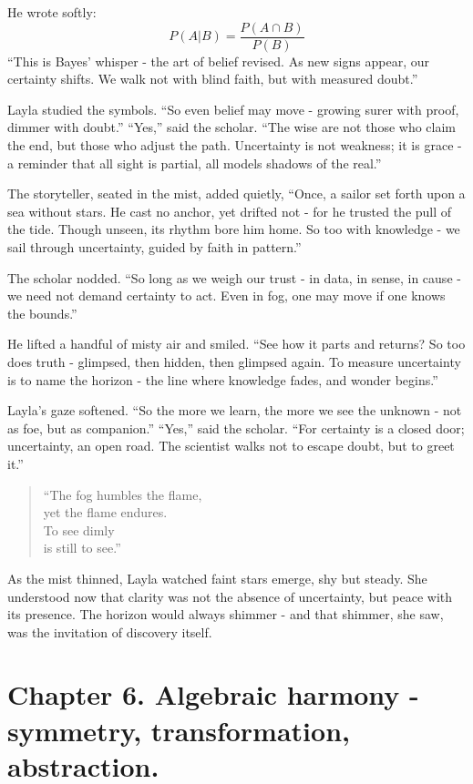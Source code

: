\documentclass[
  letterpaper,
  DIV=11,
  numbers=noendperiod]{scrreprt}
\begin{document}
He wrote softly: \[
P(A|B) = \frac{P(A \cap B)}{P(B)}
\] ``This is Bayes' whisper - the art of belief revised. As new signs
appear, our certainty shifts. We walk not with blind faith, but with
measured doubt.''

Layla studied the symbols. ``So even belief may move - growing surer
with proof, dimmer with doubt.'' ``Yes,'' said the scholar. ``The wise
are not those who claim the end, but those who adjust the path.
Uncertainty is not weakness; it is grace - a reminder that all sight is
partial, all models shadows of the real.''

The storyteller, seated in the mist, added quietly, ``Once, a sailor set
forth upon a sea without stars. He cast no anchor, yet drifted not - for
he trusted the pull of the tide. Though unseen, its rhythm bore him
home. So too with knowledge - we sail through uncertainty, guided by
faith in pattern.''

The scholar nodded. ``So long as we weigh our trust - in data, in sense,
in cause - we need not demand certainty to act. Even in fog, one may
move if one knows the bounds.''

He lifted a handful of misty air and smiled. ``See how it parts and
returns? So too does truth - glimpsed, then hidden, then glimpsed again.
To measure uncertainty is to name the horizon - the line where knowledge
fades, and wonder begins.''

Layla's gaze softened. ``So the more we learn, the more we see the
unknown - not as foe, but as companion.'' ``Yes,'' said the scholar.
``For certainty is a closed door; uncertainty, an open road. The
scientist walks not to escape doubt, but to greet it.''

\begin{quote}
``The fog humbles the flame,\\
yet the flame endures.\\
To see dimly\\
is still to see.''
\end{quote}

As the mist thinned, Layla watched faint stars emerge, shy but steady.
She understood now that clarity was not the absence of uncertainty, but
peace with its presence. The horizon would always shimmer - and that
shimmer, she saw, was the invitation of discovery itself.

\section{Chapter 6. Algebraic harmony - symmetry, transformation,
abstraction.}\label{chapter-6.-algebraic-harmony---symmetry-transformation-abstraction.}
\end{document}

